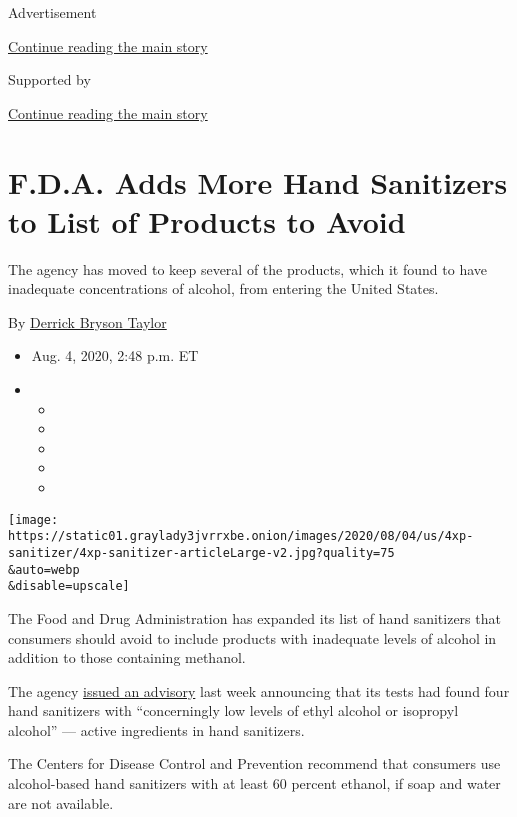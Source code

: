 Advertisement

\protect\hyperlink{after-top}{Continue reading the main story}

Supported by

\protect\hyperlink{after-sponsor}{Continue reading the main story}

\hypertarget{fda-adds-more-hand-sanitizers-to-list-of-products-to-avoid}{%
\section{F.D.A. Adds More Hand Sanitizers to List of Products to
Avoid}\label{fda-adds-more-hand-sanitizers-to-list-of-products-to-avoid}}

The agency has moved to keep several of the products, which it found to
have inadequate concentrations of alcohol, from entering the United
States.

By
\href{https://www.nytimes3xbfgragh.onion/by/derrick-bryson-taylor}{Derrick
Bryson Taylor}

\begin{itemize}
\item
  Aug. 4, 2020, 2:48 p.m. ET
\item
  \begin{itemize}
  \item
  \item
  \item
  \item
  \item
  \end{itemize}
\end{itemize}

\texttt{[image: https://static01.graylady3jvrrxbe.onion/images/2020/08/04/us/4xp-sanitizer/4xp-sanitizer-articleLarge-v2.jpg?quality=75\\\&auto=webp\\\&disable=upscale]}

The Food and Drug Administration has expanded its list of hand
sanitizers that consumers should avoid to include products with
inadequate levels of alcohol in addition to those containing methanol.

The agency
\href{https://www.fda.gov/drugs/drug-safety-and-availability/fda-updates-hand-sanitizers-consumers-should-not-use\#products}{issued
an advisory} last week announcing that its tests had found four hand
sanitizers with ``concerningly low levels of ethyl alcohol or isopropyl
alcohol'' --- active ingredients in hand sanitizers.

The Centers for Disease Control and Prevention recommend that consumers
use alcohol-based hand sanitizers with at least 60 percent ethanol, if
soap and water are not available.


